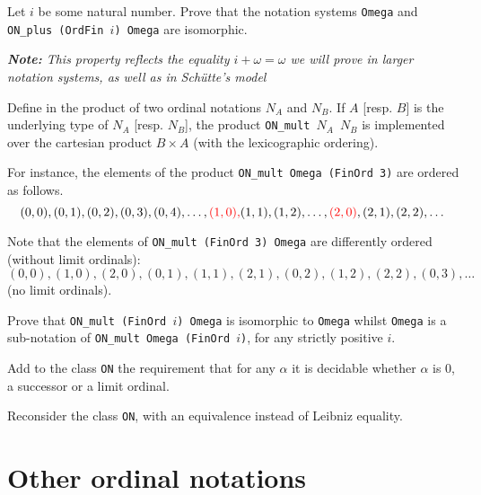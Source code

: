 
\begin{exercise}
Let $i$ be some natural number. Prove that the notation systems 
\texttt{Omega} and \texttt{ON\_plus (OrdFin $i$) Omega} are isomorphic.

{\it \textbf{Note:} This property reflects the equality $i+\omega=\omega$ we will prove in larger notation systems, as well as in Schütte's model}
\end{exercise}

\label{exo:ON-mult}
\begin{project}
Define in \coq{} the product of two ordinal notations $N_A$ and $N_B$.
If $A$ [resp. $B$] is the underlying type of $N_A$ [resp. $N_B$], the
product \texttt{ON\_mult $N_A$ $N_B$} is implemented over the cartesian product $B\times A$ (with the lexicographic ordering).

For instance, the
elements of the product \texttt{ON\_mult Omega (FinOrd 3)} are ordered as follows.
\[(0,0),(0,1),(0,2),(0,3),(0,4),\dots,{\color{red}(1,0),} (1,1),(1,2),\dots, {\color{red}(2,0)},(2,1),(2,2),\dots\]

Note that the elements of  \texttt{ON\_mult (FinOrd 3) Omega} are differently ordered (without limit ordinals):
\[(0,0),(1,0),(2,0),(0,1),(1,1),(2,1),(0,2),(1,2),(2,2),(0,3),\dots\]
(no limit ordinals).

Prove that \texttt{ON\_mult (FinOrd $i$) Omega} is isomorphic to
\texttt{Omega}  whilst
\texttt{Omega}  is a sub-notation of \texttt{ON\_mult Omega (FinOrd $i$)},
for any strictly positive $i$.
\end{project}

\begin{project}
\label{project:succ-limit-dec}
Add to the class \texttt{ON} the requirement that for any $\alpha$ it is decidable whether $\alpha$ is $0$, a successor or a limit ordinal.
\end{project}

\begin{project}
\label{project:on-setoid}
Reconsider the  class \texttt{ON}, with an equivalence instead of Leibniz equality.
\end{project}



\section{Other ordinal notations}

